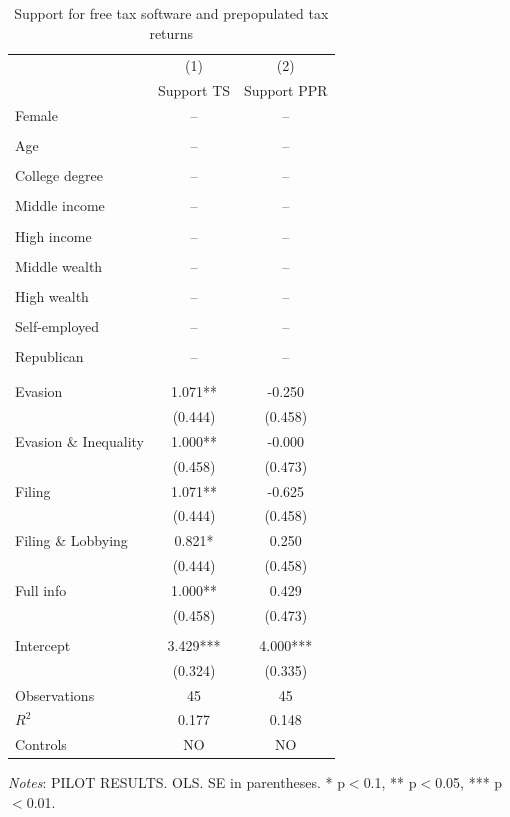 \documentclass[11pt]{article}
\begin{document}
\FloatBarrier
\begin{table}[!htbp]\centering
\caption{Support for free tax software and prepopulated tax returns}
\label{tab:supporttaxsoftware_noc}
\begin{threeparttable}
\footnotesize
\begin{tabular}{l|cc}
\toprule
& (1) & (2) \\
& Support TS & Support PPR \\
\midrule
Female & -- & -- \\
 &  &  \\
Age & -- & -- \\
 &  &  \\
College degree & -- & -- \\
 &  &  \\
Middle income & -- & -- \\
 &  &  \\
High income & -- & -- \\
 &  &  \\
Middle wealth & -- & -- \\
 &  &  \\
High wealth & -- & -- \\
 &  &  \\
Self-employed & -- & -- \\
 &  &  \\
Republican & -- & -- \\
 &  &  \\
\\[0.5em]
Evasion & 1.071** & -0.250 \\
 & (0.444) & (0.458) \\
Evasion \& Inequality & 1.000** & -0.000 \\
 & (0.458) & (0.473) \\
Filing & 1.071** & -0.625 \\
 & (0.444) & (0.458) \\
Filing \& Lobbying & 0.821* & 0.250 \\
 & (0.444) & (0.458) \\
Full info & 1.000** & 0.429 \\
 & (0.458) & (0.473) \\
\\[0.5em]
Intercept & 3.429*** & 4.000*** \\
 & (0.324) & (0.335) \\
\midrule
Observations & 45 & 45 \\
$R^2$ & 0.177 & 0.148 \\
Controls & NO & NO \\
\bottomrule
\end{tabular}
\begin{tablenotes}[flushleft]
\footnotesize
\item \textit{Notes}: PILOT RESULTS. OLS. SE in parentheses. * p$<$0.1, ** p$<$0.05, *** p$<$0.01.
\end{tablenotes}
\end{threeparttable}
\end{table}
\end{document}

